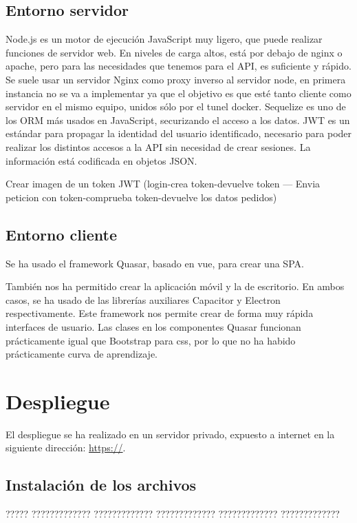 \documentclass[11pt,spanish,listoffigures,listoftables]{tfgetsinf}
\begin{document}
\section{Entorno servidor}
Node.js es un motor de ejecución JavaScript muy ligero, que puede realizar funciones de servidor web. 
En niveles de carga altos, está por debajo de nginx o apache, pero para las necesidades que tenemos para el API, es suficiente y rápido.
Se suele usar un servidor Nginx como proxy inverso al servidor node, en primera instancia no se va a implementar ya que el objetivo es que esté tanto cliente como servidor en el mismo equipo, unidos sólo por el tunel docker.
Sequelize es uno de los ORM más usados en JavaScript, securizando el acceso a los datos. 
JWT es un estándar para propagar la identidad del usuario identificado, necesario para poder realizar los distintos accesos a la API sin necesidad de crear sesiones.
La información está codificada en objetos JSON. 

Crear imagen de un token JWT (login-crea token-devuelve token --- Envia peticion con token-comprueba token-devuelve los datos pedidos)

\section{Entorno cliente}

Se ha usado el framework Quasar, basado en vue, para crear una SPA. 

También nos ha permitido crear la aplicación móvil y la de escritorio. En ambos casos, se ha usado de las librerías auxiliares Capacitor y Electron respectivamente.
Este framework nos permite crear de forma muy rápida interfaces de usuario. 
Las clases en los componentes Quasar funcionan prácticamente igual que Bootstrap para css, por lo que no ha habido prácticamente curva de aprendizaje.

\chapter{Despliegue}

El despliegue se ha realizado en un servidor privado, expuesto a internet en la siguiente dirección:
\url{https://}.

\section{Instalación de los archivos}

????? ????????????? ????????????? ????????????? ????????????? ?????????????
\end{document}

